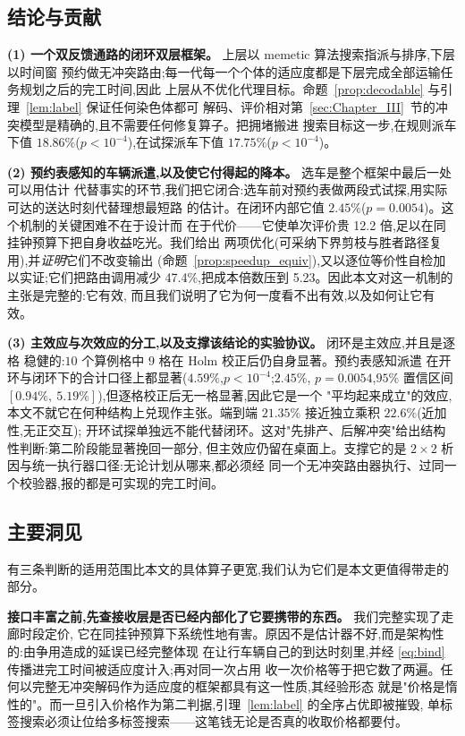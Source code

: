 \documentclass[manuscript,screen,review]{acmart}
\newcommand{\NCases}{10}
\newcommand{\GainLoopRule}{18.86\%}      %
\newcommand{\PLoopRule}{<10^{-4}}
\newcommand{\GainLoopProbe}{17.75\%}     %
\newcommand{\PLoopProbe}{<10^{-4}}
\newcommand{\GainProbeOpen}{4.59\%}      %
\newcommand{\PProbeOpen}{<10^{-4}}
\newcommand{\GainProbeLoop}{2.45\%}      %
\newcommand{\PProbeLoop}{=0.0054}
\newcommand{\GainEndToEnd}{21.35\%}      %
\newcommand{\CIProbeLoop}{$[0.94\%,\ 5.19\%]$}
\newcommand{\GainIndepProduct}{22.6\%}
\newcommand{\CellsSigLoopAdj}{9}
\newcommand{\RouteCallCut}{47.4\%}
\newcommand{\CostMultBefore}{12.2}
\newcommand{\CostMultAfter}{5.23}
\begin{document}
\subsection{结论与贡献}
\label{sec:contributions}

\textbf{(1) 一个双反馈通路的闭环双层框架。} 上层以 memetic 算法搜索指派与排序,下层以时间窗
预约做无冲突路由;每一代每一个个体的适应度都是下层完成全部运输任务规划之后的完工时间,因此
上层从不优化代理目标。命题~\ref{prop:decodable} 与引理~\ref{lem:label} 保证任何染色体都可
解码、评价相对第~\ref{sec:Chapter_III}~节的冲突模型是精确的,且不需要任何修复算子。把拥堵搬进
搜索目标这一步,在规则派车下值 $\GainLoopRule$($p\PLoopRule$),在试探派车下值
$\GainLoopProbe$($p\PLoopProbe$)。

\textbf{(2) 预约表感知的车辆派遣,以及使它付得起的降本。} 选车是整个框架中最后一处可以用估计
代替事实的环节,我们把它闭合:选车前对预约表做两段式试探,用实际可达的送达时刻代替理想最短路
的估计。在闭环内部它值 $\GainProbeLoop$($p\PProbeLoop$)。这个机制的关键困难不在于设计而
在于代价——它使单次评价贵 \CostMultBefore{} 倍,足以在同挂钟预算下把自身收益吃光。我们给出
两项优化(可采纳下界剪枝与胜者路径复用),并\emph{证明}它们不改变输出
(命题~\ref{prop:speedup_equiv}),又以逐位等价性自检加以实证;它们把路由调用减少
\RouteCallCut{},把成本倍数压到 \CostMultAfter{}。因此本文对这一机制的主张是完整的:它有效,
而且我们说明了它为何一度看不出有效,以及如何让它有效。

\textbf{(3) 主效应与次效应的分工,以及支撑该结论的实验协议。} 闭环是主效应,并且是逐格
稳健的:$\NCases$ 个算例格中 $\CellsSigLoopAdj$ 格在 Holm 校正后仍自身显著。预约表感知派遣
在开环与闭环下的合计口径上都显著($\GainProbeOpen$,$p\PProbeOpen$;$\GainProbeLoop$,
$p\PProbeLoop$,$95\%$ 置信区间 \CIProbeLoop{}),但逐格校正后无一格显著,因此它是一个
"平均起来成立"的效应,本文不就它在何种结构上兑现作主张。端到端 $\GainEndToEnd$ 接近独立乘积 $\GainIndepProduct$(近加性,无正交互);
开环试探单独远不能代替闭环。这对"先排产、后解冲突"给出结构性判断:第二阶段能显著挽回一部分,
但主效应仍留在桌面上。支撑它的是 $2\times2$ 析因与统一执行器口径:无论计划从哪来,都必须经
同一个无冲突路由器执行、过同一个校验器,报的都是可实现的完工时间。

\subsection{主要洞见}
\label{sec:insights}

有三条判断的适用范围比本文的具体算子更宽,我们认为它们是本文更值得带走的部分。

\textbf{接口丰富之前,先查接收层是否已经内部化了它要携带的东西。} 我们完整实现了走廊时段定价,
它在同挂钟预算下系统性地有害。原因不是估计器不好,而是架构性的:由争用造成的延误已经完整体现
在让行车辆自己的到达时刻里,并经 \eqref{eq:bind} 传播进完工时间被适应度计入;再对同一次占用
收一次价格等于把它数了两遍。任何以完整无冲突解码作为适应度的框架都具有这一性质,其经验形态
就是"价格是惰性的"。而一旦引入价格作为第二判据,引理~\ref{lem:label} 的全序占优即被摧毁,
单标签搜索必须让位给多标签搜索——这笔钱无论是否真的收取价格都要付。
\end{document}

